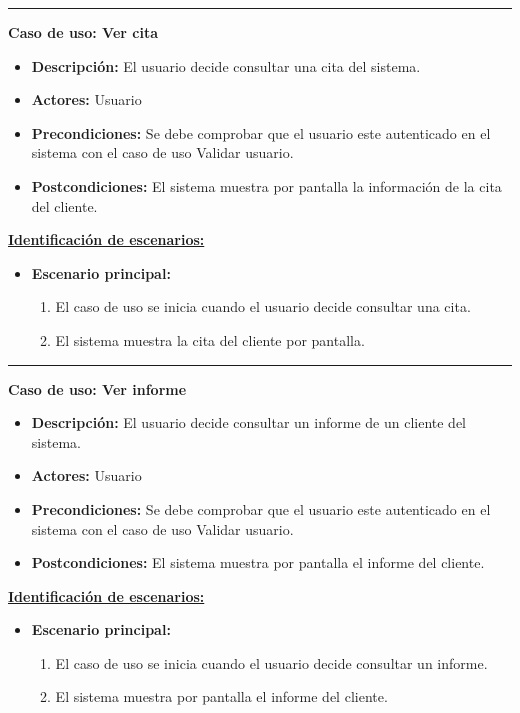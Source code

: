 \smallskip
\hrule height 1pt
\smallskip
\textbf{Caso de uso: Ver cita}
\begin{itemize}\renewcommand{\labelitemi}{$\cdot$}
 \item \textbf{Descripción:} El usuario decide consultar una cita del sistema.
  \item \textbf{Actores:} Usuario
  \item \textbf{Precondiciones:} Se debe comprobar que el usuario este autenticado en el sistema con el caso de uso Validar usuario.
  \item \textbf{Postcondiciones:} El sistema muestra por pantalla la información de la cita del cliente.
\end{itemize}
\underline{\textbf{Identificación de escenarios:}}
\begin{itemize}\renewcommand{\labelitemi}{$\circ$}
 \item \textbf{Escenario principal:}
         \begin{enumerate}
          \item El caso de uso se inicia cuando el usuario decide consultar una cita.
	  \item El sistema muestra la cita del cliente por pantalla.
         \end{enumerate}
\end{itemize}

\smallskip
\hrule height 1pt
\smallskip
\textbf{Caso de uso: Ver informe}
\begin{itemize}\renewcommand{\labelitemi}{$\cdot$}
 \item \textbf{Descripción:} El usuario decide consultar un informe de un cliente del sistema.
  \item \textbf{Actores:} Usuario
  \item \textbf{Precondiciones:} Se debe comprobar que el usuario este autenticado en el sistema con el caso de uso Validar usuario.
  \item \textbf{Postcondiciones:} El sistema muestra por pantalla el informe del cliente.
\end{itemize}
\underline{\textbf{Identificación de escenarios:}}
\begin{itemize}\renewcommand{\labelitemi}{$\circ$}
 \item \textbf{Escenario principal:}
         \begin{enumerate}
          \item El caso de uso se inicia cuando el usuario decide consultar un informe.
	  \item El sistema muestra por pantalla el informe del cliente.
         \end{enumerate}
\end{itemize}

